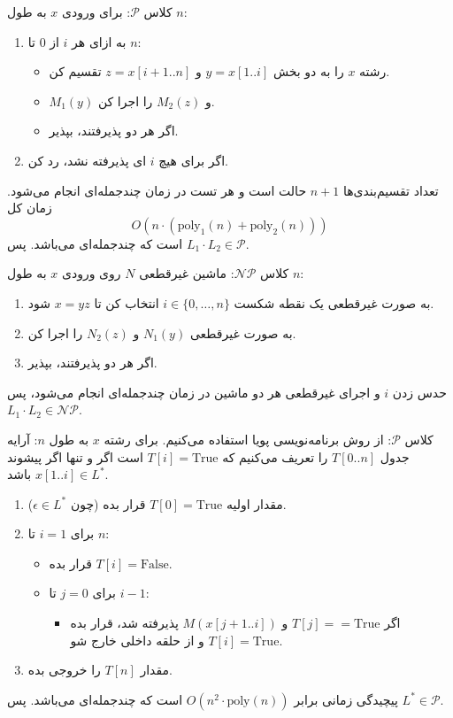 
{کلاس $\mathcal{P}$:}
برای ورودی $x$ به طول $n$:
\begin{enumerate}
    \item به ازای هر $i$ از $0$ تا $n$:
    \begin{itemize}
        \item رشته $x$ را به دو بخش $y = x[1..i]$ و $z = x[i+1..n]$ تقسیم کن.
        \item $M_1(y)$ و $M_2(z)$ را اجرا کن.
        \item اگر هر دو پذیرفتند، {بپذیر}.
    \end{itemize}
    \item اگر برای هیچ $i$ ای پذیرفته نشد، {رد کن}.
\end{enumerate}
تعداد تقسیم‌بندی‌ها $n+1$ حالت است و هر تست در زمان چندجمله‌ای انجام می‌شود. زمان کل 
\[O(n \cdot (\text{poly}_1(n) + \text{poly}_2(n)))\]
است که چندجمله‌ای می‌باشد. پس $L_1 \cdot L_2 \in \mathcal{P}$.

{کلاس $\mathcal{NP}$:}
ماشین غیرقطعی $N$ روی ورودی $x$ به طول $n$:
\begin{enumerate}
    \item به صورت غیرقطعی یک نقطه شکست $i \in \{0, \dots, n\}$ انتخاب کن تا $x = yz$ شود.
    \item به صورت غیرقطعی $N_1(y)$ و $N_2(z)$ را اجرا کن.
    \item اگر هر دو پذیرفتند، {بپذیر}.
\end{enumerate}
حدس زدن $i$ و اجرای غیرقطعی هر دو ماشین در زمان چندجمله‌ای انجام می‌شود، پس $L_1 \cdot L_2 \in \mathcal{NP}$.


{کلاس $\mathcal{P}$:}
از روش برنامه‌نویسی پویا استفاده می‌کنیم. برای رشته $x$ به طول $n$:
آرایه جدول $T[0..n]$ را تعریف می‌کنیم که $T[i] = \text{True}$ است اگر و تنها اگر پیشوند $x[1..i] \in L^*$ باشد.
\begin{enumerate}
    \item مقدار اولیه $T[0] = \text{True}$ قرار بده (چون $\epsilon \in L^*$).
    \item برای $i = 1$ تا $n$:
    \begin{itemize}
        \item قرار بده $T[i] = \text{False}$.
        \item برای $j = 0$ تا $i-1$:
        \begin{itemize}
            \item اگر $T[j] == \text{True}$ و $M(x[j+1..i])$ پذیرفته شد، قرار بده $T[i] = \text{True}$ و از حلقه داخلی خارج شو.
        \end{itemize}
    \end{itemize}
    \item مقدار $T[n]$ را خروجی بده.
\end{enumerate}
پیچیدگی زمانی برابر $O(n^2 \cdot \text{poly}(n))$ است که چندجمله‌ای می‌باشد. پس $L^* \in \mathcal{P}$.

